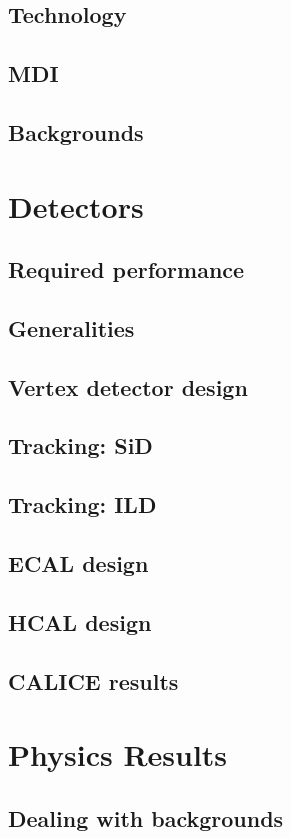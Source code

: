 \documentclass{beamer}
\begin{document}
\subsection{Technology}%
\subsection{MDI}%
\subsection{Backgrounds}%

\section{Detectors}
\subsection{Required performance}%
\subsection{Generalities}%
\subsection{Vertex detector design}%
\subsection{Tracking: SiD}%
\subsection{Tracking: ILD}%
\subsection{ECAL design}%
\subsection{HCAL design}%
\subsection{CALICE results}%

\section{Physics Results}
\subsection{Dealing with backgrounds}%
\end{document}
